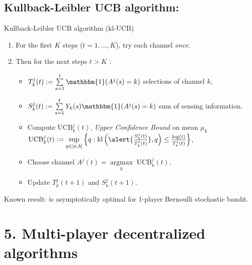 \documentclass[12pt,english,ignorenonframetext,aspectratio=169,]{beamer}
\providecommand{\tightlist}{%
  \setlength{\itemsep}{0pt}\setlength{\parskip}{0pt}}
\begin{document}
\subsection{\hfill{}Kullback-Leibler UCB algorithm: \klUCB\hfill{}}

\begin{frame}{Kullback-Leibler UCB algorithm
(\(\mathrm{kl}\)-\(\mathrm{UCB}\))}

\begin{enumerate}
\def\labelenumi{\arabic{enumi}.}
\tightlist
\item
  For the first \(K\) steps (\(t=1,\dots,K\)), try each channel
  \emph{once}.
\item
  Then for the next steps \(t > K\) :

  \begin{itemize}
  \tightlist
  \item
  \(T_k^j(t) := \sum\limits_{s=1}^{t} \mathbbm{1}(A^j(s) = k)\) selections of channel \(k\),
  \item
  \(S_k^j(t) := \sum\limits_{s=1}^{t} Y_{k}(s) \mathbbm{1}(A^j(s) = k)\) sum of sensing information.
  \item
    Compute \(\mathrm{UCB}_k^j(t)\), \emph{Upper Confidence Bound} on mean \(\mu_k\)
    \newline
    \(\mathrm{UCB}_k^j(t) := \sup\limits_{q \in [a, b]} \left\{ q : \mathrm{kl}\left(\alert{\frac{S_k^j(t)}{T_k^j(t)}}, q\right) \leq \frac{\log(t)}{T_k^j(t)} \right\}\),
  \item
    Choose channel \(A^j(t) = \mathop{\arg\max}\limits_{k} \; \mathrm{UCB}_k^j(t)\),
  \item
    Update \(T_k^j(t+1)\) and \(S_k^j(t+1)\).
  \end{itemize}
\end{enumerate}

\begin{small}
  Known result:
  \klUCB{}
  is asymptotically optimal for $1$-player Bernoulli stochastic bandit.
\end{small}

\end{frame}



\section{\hfill{}5. Multi-player decentralized algorithms\hfill{}}
\end{document}
